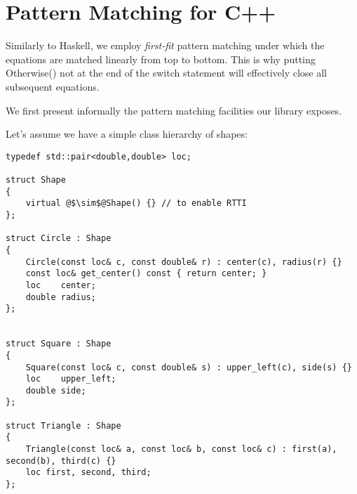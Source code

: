 \documentclass[preprint]{sigplanconf}
\begin{document}

\section{Pattern Matching for C++} %
\label{sec:pm}

Similarly to Haskell, we employ \emph{first-fit} pattern matching under which the 
equations are matched linearly from top to bottom. This is why putting 
Otherwise() not at the end of the switch statement will effectively close all 
subsequent equations.

We first present informally the pattern matching facilities our library exposes.

Let's assume we have a simple class hierarchy of shapes:

\begin{lstlisting}
typedef std::pair<double,double> loc;

struct Shape
{
    virtual @$\sim$@Shape() {} // to enable RTTI
};

struct Circle : Shape
{
    Circle(const loc& c, const double& r) : center(c), radius(r) {}
    const loc& get_center() const { return center; }
    loc    center;
    double radius;
};


struct Square : Shape
{
    Square(const loc& c, const double& s) : upper_left(c), side(s) {}
    loc    upper_left;
    double side;
};

struct Triangle : Shape
{
    Triangle(const loc& a, const loc& b, const loc& c) : first(a), second(b), third(c) {}
    loc first, second, third;
};
\end{lstlisting}
\end{document}
